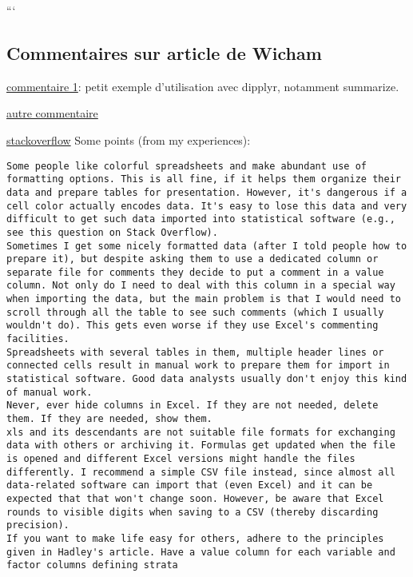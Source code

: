 \documentclass[]{article}
\begin{document}
```

\subsection{Commentaires sur article de
Wicham}\label{commentaires-sur-article-de-wicham}

\href{http://serialmentor.com/blog/2014/7/20/keep-your-data-tidy}{commentaire
1}: petit exemple d'utilisation avec dipplyr, notamment summarize.

\href{http://www.dataschool.io/tidying-messy-data-in-r/}{autre
commentaire}

\href{http://stats.stackexchange.com/questions/83614/best-practices-for-creating-tidy-data}{stackoverflow}
Some points (from my experiences):

\begin{verbatim}
Some people like colorful spreadsheets and make abundant use of formatting options. This is all fine, if it helps them organize their data and prepare tables for presentation. However, it's dangerous if a cell color actually encodes data. It's easy to lose this data and very difficult to get such data imported into statistical software (e.g., see this question on Stack Overflow).
Sometimes I get some nicely formatted data (after I told people how to prepare it), but despite asking them to use a dedicated column or separate file for comments they decide to put a comment in a value column. Not only do I need to deal with this column in a special way when importing the data, but the main problem is that I would need to scroll through all the table to see such comments (which I usually wouldn't do). This gets even worse if they use Excel's commenting facilities.
Spreadsheets with several tables in them, multiple header lines or connected cells result in manual work to prepare them for import in statistical software. Good data analysts usually don't enjoy this kind of manual work.
Never, ever hide columns in Excel. If they are not needed, delete them. If they are needed, show them.
xls and its descendants are not suitable file formats for exchanging data with others or archiving it. Formulas get updated when the file is opened and different Excel versions might handle the files differently. I recommend a simple CSV file instead, since almost all data-related software can import that (even Excel) and it can be expected that that won't change soon. However, be aware that Excel rounds to visible digits when saving to a CSV (thereby discarding precision).
If you want to make life easy for others, adhere to the principles given in Hadley's article. Have a value column for each variable and factor columns defining strata
\end{verbatim}
\end{document}
